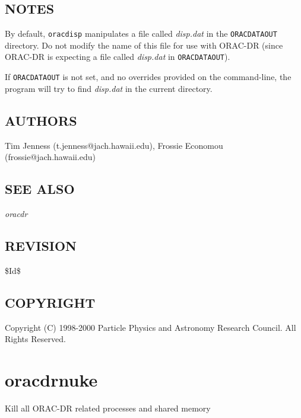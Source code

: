 \documentclass[twoside,11pt]{article}
\renewcommand{\_}{\texttt{\symbol{95}}}
\begin{document}
\subsection*{NOTES\label{oracdisp_NOTES}}


By default, \texttt{oracdisp} manipulates a file called \emph{disp.dat}
in the \texttt{ORAC\_DATA\_OUT} directory. Do not modify the name of this
file for use with ORAC-DR (since ORAC-DR is expecting a file
called \emph{disp.dat} in \texttt{ORAC\_DATA\_OUT}).



If \texttt{ORAC\_DATA\_OUT} is not set, and no overrides provided on the
command-line, the program will try to find \emph{disp.dat} in the current
directory.

\subsection*{AUTHORS\label{oracdisp_AUTHORS}}


Tim Jenness (t.jenness@jach.hawaii.edu),
Frossie Economou (frossie@jach.hawaii.edu)

\subsection*{SEE ALSO\label{oracdisp_SEE_ALSO}}


\emph{oracdr}

\subsection*{REVISION\label{oracdisp_REVISION}}


\$Id\$

\subsection*{COPYRIGHT\label{oracdisp_COPYRIGHT}}


Copyright (C) 1998-2000 Particle Physics and Astronomy Research
Council. All Rights Reserved.


\section{oracdr\_nuke\label{oracdr_nuke}}


Kill all ORAC-DR related processes and shared memory
\end{document}
